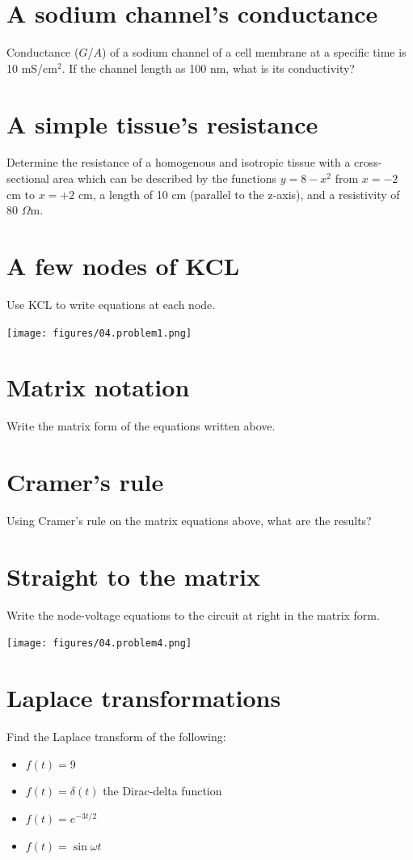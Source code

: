 \documentclass[11pt]{book}
\begin{document}
\section{A sodium channel's conductance}
Conductance ($G$/$A$) of a sodium channel of a cell membrane at a specific time is 10 mS/cm$^{2}$. If the channel length as 100 nm, what is its conductivity?



\section{A simple tissue's resistance}
Determine the resistance of a homogenous and isotropic tissue with a cross-sectional area which can be described by the functions $y = 8 - x^2$ from $x = -2$ cm to $x = +2$ cm, a length of 10 cm (parallel to the z-axis), and a resistivity of 80 $\Omega$m.

\section{A few nodes of KCL}
Use KCL to write equations at each node.
\begin{center}
	\texttt{[image: figures/04.problem1.png]}
\end{center}


\section{Matrix notation}
Write the matrix form of the equations written above. 


\section{Cramer's rule}
Using Cramer’s rule on the matrix equations above, what are the results?



\section{Straight to the matrix}
Write the node-voltage equations to the circuit at right in the matrix form.
\begin{center}
	\texttt{[image: figures/04.problem4.png]}
\end{center}

\section{Laplace transformations}
Find the Laplace transform of the following:
\begin{itemize}
	\item $f(t) = 9$
	\item $f(t) = \delta(t)$ the Dirac-delta function
	\item $f(t) = e^{-3t/2}$
	\item $f(t) = \sin\omega t$
\end{itemize}
\end{document}
